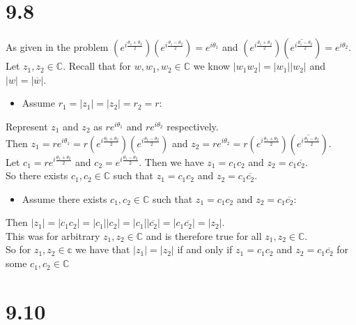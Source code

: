 \documentclass{article}
\begin{document}
\section*{9.8}
\begin{center}
    \doublespacing
    As given in the problem $(e^{i\frac{\theta _1 +\theta _2}{2}})(e^{i\frac{\theta _1 -\theta _2}{2}}) = e^{i\theta _1}$ and $(e^{i\frac{\theta _1 +\theta _2}{2}})(\overline{e^{i\frac{\theta _1 -\theta _2}{2}}}) = e^{i\theta _2}$.
    \\Let $z_1, z_2\in\mathbb{C}$. Recall that for $w, w_1, w_2\in\mathbb{C}$ we know $|w_1 w_2| = |w_1||w_2|$ and $|w| = |\overline{w}|$.
    \begin{itemize}
        \item Assume $r_1 = |z_1| = |z_2| = r_2 = r$:
    \end{itemize}
    Represent $z_1$ and $z_2$ as $r e^{i\theta _1}$ and $r e^{i\theta _2}$ respectively.
    \\Then $z_1 = r e^{i\theta _1} = r (e^{i\frac{\theta _1 +\theta _2}{2}})(e^{i\frac{\theta _1 -\theta _2}{2}})$ and $z_2 = r e^{i\theta _2} = r (e^{i\frac{\theta _1 +\theta _2}{2}})(\overline{e^{i\frac{\theta _1 -\theta _2}{2}}})$.
    \\Let $c_1 = r e^{i\frac{\theta _1 +\theta _2}{2}}$ and $c_2 = e^{i\frac{\theta _1 -\theta _2}{2}}$. Then we have $z_1 = c_1 c_2$ and $z_2 = c_1\overline{c_2}$.
    \\So there exists $c_1, c_2\in\mathbb{C}$ such that $z_1 = c_1 c_2$ and $z_2 = c_1\overline{c_2}$.
    \begin{itemize}
        \item Assume there exists $c_1, c_2\in\mathbb{C}$ such that $z_1 = c_1 c_2$ and $z_2 = c_1\overline{c_2}$:
    \end{itemize}
    Then $|z_1| = |c_1 c_2| = |c_1||c_2| = |c_1||\overline{c_2}| = |c_1\overline{c_2}| = |z_2|$.
    \break
    \\This was for arbitrary $z_1, z_2\in\mathbb{C}$ and is therefore true for all $z_1, z_2\in\mathbb{C}$.
    \\So for $z_1, z_2\in\mathbb{c}$ we have that $|z_1| = |z_2|$ if and only if $z_1 = c_1 c_2$ and $z_2 = c_1\overline{c_2}$ for some $c_1, c_2\in\mathbb{C}$ \qedsymbol
\end{center}


\newpage
\section*{9.10}
\end{document}
